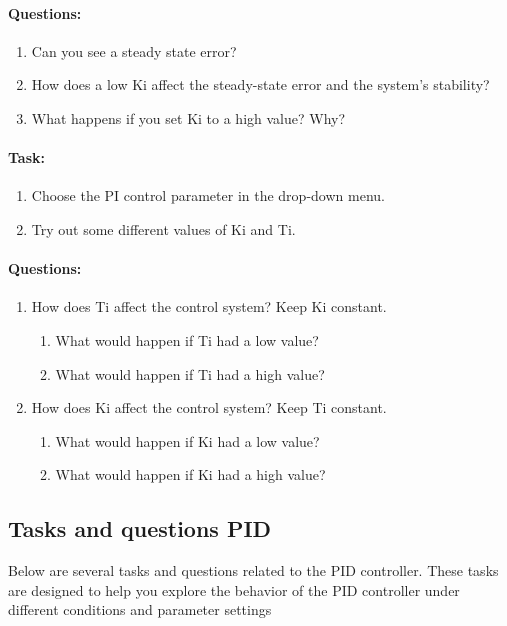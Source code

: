 \paragraph{Questions:}
\begin{enumerate}[]
	\item Can you see a steady state error?
	\item How does a low Ki affect the steady-state error and the system's stability?
	\item What happens if you set Ki to a high value? Why?
\end{enumerate}
\paragraph{Task:}
\begin{enumerate}[]
	\item Choose the PI control parameter in the drop-down menu.
	\item Try out some different values of Ki and Ti.
\end{enumerate}
\paragraph{Questions:}
\begin{enumerate}[]
	\item How does Ti  affect the control system? Keep Ki constant.
	\begin{enumerate}[]
	\item What would happen if Ti  had a low value? 
	\item What would happen if Ti  had a high value?
	\end{enumerate}
	\item How does Ki  affect the control system? Keep Ti  constant.
	\begin{enumerate}[]
	\item What would happen if Ki  had a low value? 
	\item What would happen if Ki  had a high value?
	\end{enumerate}
\end{enumerate}


\newpage
\subsection{Tasks and questions PID}
Below are several tasks and questions related to the PID controller. These tasks are designed to help you explore the behavior of the PID controller under different conditions and parameter settings
